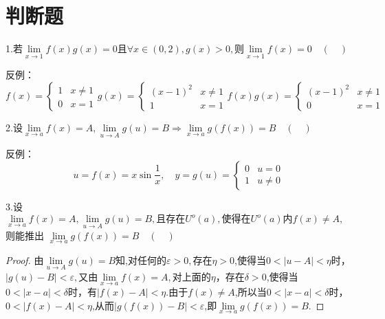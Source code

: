\documentclass[12pt, a4paper]{ctexart}
\begin{document}
\section{判断题}
    \begin{flushleft}
    1.若$\lim \limits _{x \rightarrow 1} f(x)g(x) = 0\text{且}\forall x \in (0,2),g(x)>0,\text{则} \lim \limits _{x \rightarrow 1} f(x) = 0 \quad(\quad)$

    反例：\[
    f(x) =     
    \left\{
    \begin{array}{ll}
    {1} & {x \neq 1} \\ 
    {0} & {x = 1}
    \end{array}\right.
    g(x) =     
    \left\{
    \begin{array}{ll}
    {(x-1)^2} & {x \neq 1} \\ 
    {1} & {x = 1}
    \end{array}\right. 
    f(x)g(x)=    
    \left\{
    \begin{array}{ll}
    {(x-1)^2} & {x \neq 1} \\ 
    {0} & {x = 1}
    \end{array}\right.
    \]
    


    2.设$\lim \limits _{x \rightarrow a} f(x) = A,\lim \limits _{u \rightarrow A} g(u) = B \Rightarrow \lim \limits _{x \rightarrow a} g(f(x)) = B \quad(\quad)$

    反例：\[
    u=f(x)=x \sin \frac{1}{x}, \quad y=g(u)=    
    \left\{
    \begin{array}{ll}
    {0} & {u=0} \\ 
    {1} & {u \neq 0}
    \end{array}\right.
    \]

    3.设$\lim \limits _{x \rightarrow a} f(x) = A, \lim \limits _{u \rightarrow A} g(u) = B,\text{且存在} U^{o}(a),\text{使得在}U^{o}(a)\text{内} f(x) \neq A,$则能推出 $\lim \limits _{x \rightarrow a} g(f(x)) = B \quad(\quad)$

    \begin{proof}
    由$\lim \limits _{u \rightarrow A} g(u) = B$知,对任何的$\varepsilon > 0,$存在$\eta > 0$,使得当$0 < \vert u - A \vert < \eta$时，$\vert g(u) - B \vert < \varepsilon,$又由$\lim \limits _{x \rightarrow a} f(x) = A,$对上面的$\eta$，存在$\delta > 0$,使得当$0 < \vert x - a \vert < \delta$时，有$\vert f(x) - A \vert< \eta$.由于$f(x) \neq A$,所以当$0 < \vert x - a \vert < \delta$时，$0 < \vert f(x) - A \vert < \eta $,从而$\vert g(f(x)) - B \vert < \varepsilon$,即$\lim \limits _{x \rightarrow a}g(f(x)) = B.$
    \end{proof}

    \end{flushleft}
\end{document}
